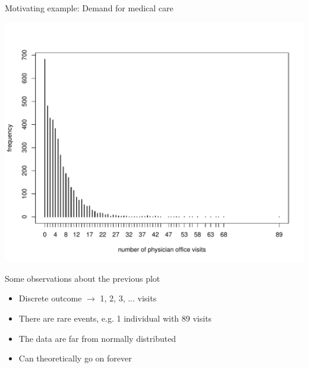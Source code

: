 \documentclass{beamer}\usepackage[]{graphicx}\usepackage[]{color}
\newenvironment{knitrout}{}{} %
\begin{document}
\begin{frame}[fragile]{Motivating example: Demand for medical care}

\vspace*{-0.2in}

\begin{knitrout}\scriptsize
{}\color{fgcolor}

{\centering \includegraphics[width=1\linewidth]{figure/unnamed-chunk-1-1} 

}



\end{knitrout}


\end{frame}


\begin{frame}{Some observations about the previous plot}

\begin{itemize}
	\setlength\itemsep{1em}
	\item Discrete outcome $\to$ 1, 2, 3, ... visits \pause 
	\item There are rare events, e.g. 1 individual with 89 visits \pause 
	\item The data are far from normally distributed \pause
	\item Can theoretically go on forever
\end{itemize}

\end{frame}
\end{document}
